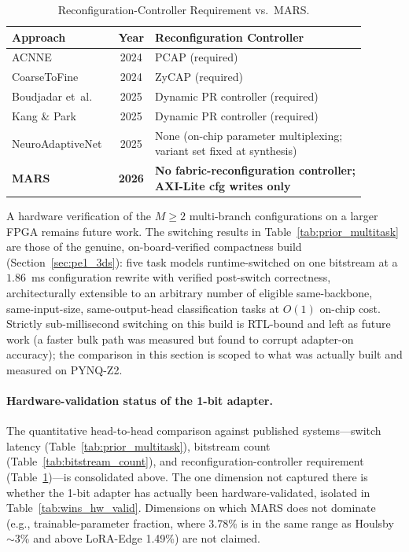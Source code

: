 \documentclass[12pt, a4paper]{report}
\numberwithin{equation}{chapter}
\numberwithin{figure}{chapter}
\numberwithin{table}{chapter}
\numberwithin{algorithm}{chapter}
\begin{document}
\begin{table}[H]
\centering
\caption{Reconfiguration-Controller Requirement vs.\ MARS.}
\label{tab:reconfig_ctrl}
\small
\begin{tabular}{lcl}
\toprule
\textbf{Approach} & \textbf{Year} & \textbf{Reconfiguration Controller} \\
\midrule
ACNNE~\cite{Huang2024ACNNE}                       & 2024 & PCAP (required) \\
CoarseToFine~\cite{Rangsikunpum2024CoarseToFine}  & 2024 & ZyCAP (required) \\
Boudjadar et~al.~\cite{Boudjadar2025DynamicFPGA}  & 2025 & Dynamic PR controller (required) \\
Kang \& Park~\cite{Kang2025RuntimeRobust}         & 2025 & Dynamic PR controller (required) \\
NeuroAdaptiveNet~\cite{ElBouazzaoui2025NeuroAdaptive} & 2025 & \makecell[l]{None (on-chip parameter multiplexing;\\variant set fixed at synthesis)} \\
\textbf{MARS} & \textbf{2026} & \makecell[l]{\textbf{No fabric-reconfiguration controller;}\\\textbf{AXI-Lite cfg writes only}} \\
\bottomrule
\end{tabular}
\end{table}

A hardware verification of the $M{\geq}2$ multi-branch configurations on a larger FPGA remains future work. The switching results in Table~\ref{tab:prior_multitask} are those of the genuine, on-board-verified compactness build (Section~\ref{sec:pe1_3ds}): five task models runtime-switched on one bitstream at a $1.86$~ms configuration rewrite with verified post-switch correctness, architecturally extensible to an arbitrary number of eligible same-backbone, same-input-size, same-output-head classification tasks at $O(1)$ on-chip cost. Strictly sub-millisecond switching on this build is RTL-bound and left as future work (a faster bulk path was measured but found to corrupt adapter-on accuracy); the comparison in this section is scoped to what was actually built and measured on PYNQ-Z2.

\paragraph{Hardware-validation status of the 1-bit adapter.}
\label{sec:wins_tables}

The quantitative head-to-head comparison against published systems---switch latency (Table~\ref{tab:prior_multitask}), bitstream count (Table~\ref{tab:bitstream_count}), and reconfiguration-controller requirement (Table~\ref{tab:reconfig_ctrl})---is consolidated above. The one dimension not captured there is whether the 1-bit adapter has actually been hardware-validated, isolated in Table~\ref{tab:wins_hw_valid}. Dimensions on which MARS does not dominate (e.g., trainable-parameter fraction, where 3.78\% is in the same range as Houlsby $\sim$3\% and above LoRA-Edge 1.49\%) are not claimed.
\end{document}
